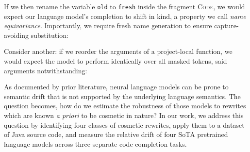 \documentclass[usenames,dvipsnames]{article} %
\begin{document}
  If we then rename the variable \texttt{old} to \texttt{fresh} inside the fragment \textsc{Code}, we would expect our language model's completion to shift in kind, a property we call \textit{name equivariance}. Importantly, we require fresh name generation to ensure capture-avoiding substitution:

  \begin{center}
    \begin{prooftree}
    \end{prooftree}
  \end{center}

  Consider another: if we reorder the arguments of a project-local function, we would expect the model to perform identically over all masked tokens, said arguments notwithstanding:

  \begin{center}
    \begin{prooftree}
    \end{prooftree}
  \end{center}

As documented by prior literature, neural language models can be prone to semantic drift that is not supported by the underlying language semantics. The question becomes, how do we estimate the robustness of those models to rewrites which are known \textit{a priori} to be cosmetic in nature? In our work, we address this question by identifying four classes of cosmetic rewrites, apply them to a dataset of Java source code, and measure the relative drift of four SoTA pretrained language models across three separate code completion tasks.


\end{document}
